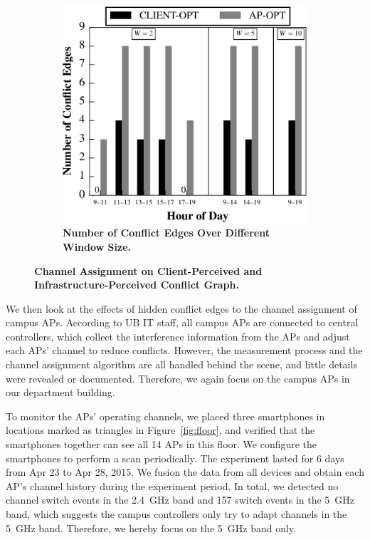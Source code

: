 \begin{figure}[t!]
\begin{subfigure}[t]{\columnwidth}
    \includegraphics[width=\textwidth]{./figures/DavisConflictEdgeMultiHour.pdf}
    \caption{\textbf{Number of Conflict Edges Over Different Window Size.}}
    \label{fig:window}
  \end{subfigure}
  \caption{\textbf{Channel Assignment on Client-Perceived and Infrastructure-Perceived
  Conflict Graph.}}
  \vspace*{\aftercaptiongap}
  \vspace*{0.1in}
\end{figure}


We then look at the effects of hidden conflict edges to the channel assignment
of campus APs. According to UB IT staff, all campus APs are connected to
central controllers, which collect the interference information from the APs and
adjust each APs' channel to reduce conflicts. However, the measurement process
and the channel assignment algorithm are all handled behind the scene, and
little details were revealed or documented. Therefore, we again focus on
the campus APs in our department building.

To monitor the APs' operating channels, we placed three smartphones in locations
marked as triangles in Figure~\ref{fig:floor}, and verified that the smartphones
together can see all 14 APs in this floor. We configure the smartphones to
perform a \wifi{} scan periodically. The experiment lasted for 6 days from Apr
23 to Apr 28, 2015. We fusion the data from all devices and obtain each AP's
channel history during the experiment period. In total, we detected no channel
switch events in the 2.4~GHz band and 157 switch events in the 5~GHz band, which
suggests the campus controllers only try to adapt channels in the 5~GHz band.
Therefore, we hereby focus on the 5~GHz band only.


